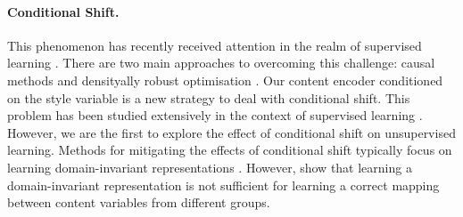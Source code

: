 \documentclass[../thesis.tex]{subfiles}
\begin{document}

\paragraph{Conditional Shift.} This phenomenon has recently received attention in the realm of supervised learning \citep{liuNeedLanguageDescribing2023}. There are two main approaches to overcoming this challenge: causal methods \citep{scholkopfCausalRepresentationLearning2021} and densityally robust optimisation \citep{blanchetRobustWassersteinProfile2019}. Our content encoder conditioned on the style variable is a new strategy to deal with conditional shift. This problem has been studied extensively in the context of supervised learning \citep{zhangDomainAdaptationTarget2013,gongDomainAdaptationConditional2016}. However, we are the first to explore the effect of conditional shift on unsupervised learning. Methods for mitigating the effects of conditional shift typically focus on learning domain-invariant representations \citep{ben2010theory}. However, \citet{zhaoLearningInvariantRepresentations2019} show that learning a domain-invariant representation is not sufficient for learning a correct mapping between content variables from different groups.

\end{document}
